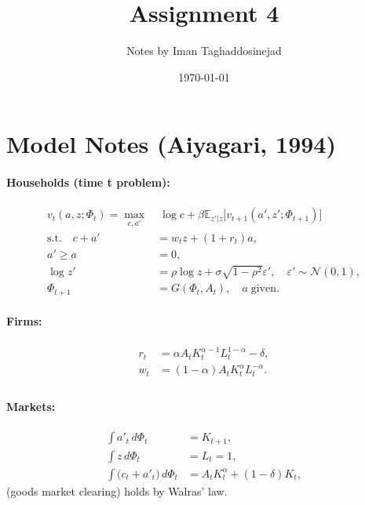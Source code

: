 \documentclass[12pt]{article}
\title{Assignment 4}
\author{Notes by Iman Taghaddosinejad}
\date{\today}
\theoremstyle{remark}
\begin{document}
\maketitle

\section{Model Notes (Aiyagari, 1994)}
\paragraph{Households (time t problem):}
\begin{align*}
    v_t(a,z;\Phi_t) = 
    \max_{c,a'}& \; \log{c} + \beta\mathbb{E}_{z'|z}\bigl[v_{t+1}(a',z';\Phi_{t+1})\bigr] \\
    \text{s.t.}\quad c + a' &= w_t z + (1 + r_t)a, \\ 
    a'\geq \underbar{a}&=0, \\
    \log{z'} &= \rho\log{z} + \sigma\sqrt{1-\rho^2}\varepsilon', 
    \quad \varepsilon'\sim\mathcal{N}(0,1), \\
    \Phi_{t+1} &= G(\Phi_t,A_t), \quad a \; \text{given}.
\end{align*}

\paragraph{Firms:} 
\begin{align*}
    r_t &= \alpha A_t K_t^{\alpha-1}L_t^{1-\alpha} - \delta, \\
    w_t &= (1-\alpha) A_t K_t^{\alpha}L_t^{-\alpha}. \\
\end{align*}

\paragraph{Markets:} 
\begin{align*}
    \int a'_t \, d\Phi_t &= K_{t+1},  \\
    \int z \, d\Phi_t &= L_t = 1, \\
    \int \bigl(c_t+a'_t\bigr) \, d\Phi_t &= A_tK_t^\alpha + (1-\delta) K_t,
\end{align*}
(goods market clearing) holds by Walras' law.
\end{document}
